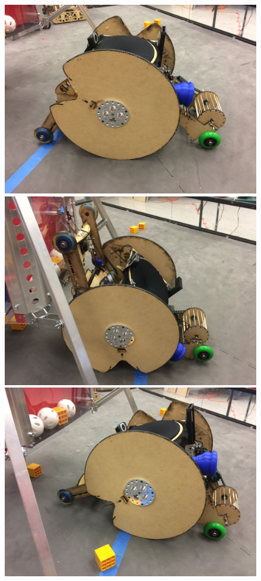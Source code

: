 \begin{figure}[h!]
\centering
\begin{minipage}{.32\textwidth}
  \centering
  \includegraphics[width= .9\linewidth]{Design_Overview/Natural.JPG} %
\end{minipage}%
\hfill
\begin{minipage}{.32\textwidth}
  \centering
  \includegraphics[width= .9\linewidth]{Design_Overview/hang_angle.JPG} %
\end{minipage}%
  \hfill
\begin{minipage}{.32\textwidth}
  \centering
  \includegraphics[width= .9\linewidth]{Design_Overview/shooter_angle.JPG} %
\end{minipage}
\end{figure}


